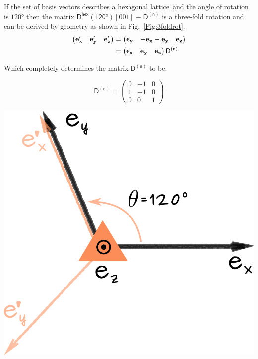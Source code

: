 \noindent \begin{minipage}{0.57\textwidth}

If the set of basis vectors describes a hexagonal lattice\footnotemark \, and the angle of rotation is $120\si{\degree}$ then the matrix $\mathsf{D^{hex}(120\si{\degree})}[001] \equiv \mathsf{D^{(n)}}$ is a three-fold rotation and can be derived by geometry as shown in Fig.~\ref{Fig:3foldrot}.
\begin{equation*}
\begin{split}
\begin{pmatrix}
\vb{e'_x} & \vb{e'_y} & \vb{e'_z}
\end{pmatrix}
 & =
\begin{pmatrix}
\vb{e_y} & -\vb{e_x} -\vb{e_y} & \vb{e_z}
\end{pmatrix} \\
&=\begin{pmatrix}
\vb{e_x} & \vb{e_y} & \vb{e_z}
\end{pmatrix}
\mathsf{D^{(n)}}
\end{split}
\end{equation*}

Which completely determines the matrix $\mathsf{D^{(n)}}$ to be:

\begin{equation}
\mathsf{D ^{(n)}} = \begin{pmatrix} 
0 & -1 & 0 \\
1 & -1 & 0 \\
0 & 0 & 1 
\end{pmatrix}
\label{eq:D_n}
\end{equation}
\end{minipage}
\begin{minipage}{0.4\textwidth}
    \centering
\includegraphics[width=0.85\linewidth]{Figures/3FoldaxisRot.png}
\captionsetup{width=0.7\linewidth}
\label{Fig:3foldrot}
\end{minipage}

